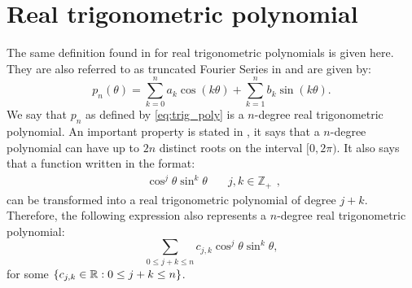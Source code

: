 \section{Real trigonometric polynomial}

The same definition found in  for real trigonometric polynomials is given here. They are also referred to as truncated Fourier Series in  and are given by:
\begin{equation}\label{eq:trig_poly}
p_n(\theta) = \sum_{k=0}^{n} a_k\cos(k\theta) + \sum_{k=1}^{n} b_k\sin(k\theta).
\end{equation}
We say that $p_n$ as defined by \autoref{eq:trig_poly} is a $n$-degree real trigonometric polynomial. An important property is stated in , it says that a $n$-degree polynomial can have up to $2n$ distinct roots on the interval $[0, 2\pi)$. It also says that a function written in the format:
$$\begin{array}{cc}\cos^j{\theta}\sin^k{\theta} & \quad j, k \in \mathbb{Z}_+ \end{array},$$
can be transformed into a real trigonometric polynomial of degree $j+k$. Therefore, the following expression also represents a $n$-degree real trigonometric polynomial:
\begin{equation}\label{eq:trig_poly_2}
\sum_{0 \le j+k \le n}c_{j,k}\cos^j{\theta}\sin^k{\theta},
\end{equation}
for some $\{c_{j,k} \in \mathbb{R}: 0 \le j+k \le n\}$.